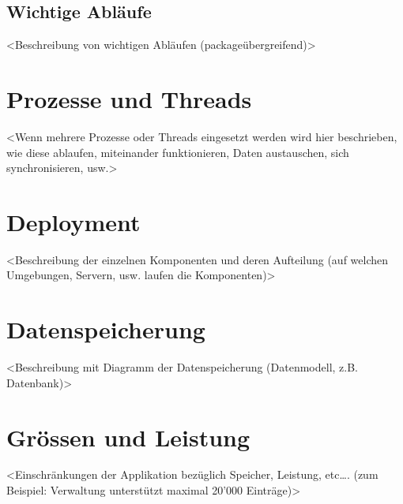 \documentclass[11pt]{scrartcl}
\begin{document}
\subsection{Wichtige Abläufe}
<Beschreibung von wichtigen Abläufen (packageübergreifend)>
 
\section{Prozesse und Threads}
<Wenn mehrere Prozesse oder Threads eingesetzt werden wird hier beschrieben, wie diese ablaufen, miteinander funktionieren, Daten austauschen, sich synchronisieren, usw.>
 
\section{Deployment}
<Beschreibung der einzelnen Komponenten und deren Aufteilung (auf welchen Umgebungen, Servern, usw. laufen die Komponenten)>
 
\section{Datenspeicherung}
<Beschreibung mit Diagramm der Datenspeicherung (Datenmodell, z.B. Datenbank)>
 
\section{Grössen und Leistung}
<Einschränkungen der Applikation bezüglich Speicher, Leistung, etc…. (zum Beispiel: Verwaltung unterstützt maximal 20'000 Einträge)>
\end{document}
